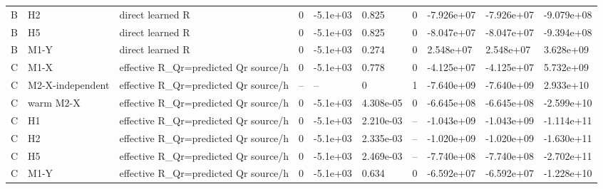 \begin{tabular}{llllllllll}
B & H2 & direct learned R & 0 & -5.1e+03 & 0.825 & 0 & -7.926e+07 & -7.926e+07 & -9.079e+08 \\
B & H5 & direct learned R & 0 & -5.1e+03 & 0.825 & 0 & -8.047e+07 & -8.047e+07 & -9.394e+08 \\
B & M1-Y & direct learned R & 0 & -5.1e+03 & 0.274 & 0 & 2.548e+07 & 2.548e+07 & 3.628e+09 \\
C & M1-X & effective R\_Qr=predicted Qr source/h & 0 & -5.1e+03 & 0.778 & 0 & -4.125e+07 & -4.125e+07 & 5.732e+09 \\
C & M2-X-independent & effective R\_Qr=predicted Qr source/h & -- & -- & 0 & 1 & -7.640e+09 & -7.640e+09 & 2.933e+10 \\
C & warm M2-X & effective R\_Qr=predicted Qr source/h & 0 & -5.1e+03 & 4.308e-05 & 0 & -6.645e+08 & -6.645e+08 & -2.599e+10 \\
C & H1 & effective R\_Qr=predicted Qr source/h & 0 & -5.1e+03 & 2.210e-03 & -- & -1.043e+09 & -1.043e+09 & -1.114e+11 \\
C & H2 & effective R\_Qr=predicted Qr source/h & 0 & -5.1e+03 & 2.335e-03 & -- & -1.020e+09 & -1.020e+09 & -1.630e+11 \\
C & H5 & effective R\_Qr=predicted Qr source/h & 0 & -5.1e+03 & 2.469e-03 & -- & -7.740e+08 & -7.740e+08 & -2.702e+11 \\
C & M1-Y & effective R\_Qr=predicted Qr source/h & 0 & -5.1e+03 & 0.634 & 0 & -6.592e+07 & -6.592e+07 & -1.228e+10 \\
\bottomrule
\end{tabular}
